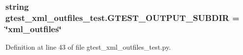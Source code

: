 \subsubsection[{\texorpdfstring{G\+T\+E\+S\+T\+\_\+\+O\+U\+T\+P\+U\+T\+\_\+\+S\+U\+B\+D\+IR}{GTEST_OUTPUT_SUBDIR}}]{\setlength{\rightskip}{0pt plus 5cm}string gtest\+\_\+xml\+\_\+outfiles\+\_\+test.\+G\+T\+E\+S\+T\+\_\+\+O\+U\+T\+P\+U\+T\+\_\+\+S\+U\+B\+D\+IR = \char`\"{}xml\+\_\+outfiles\char`\"{}}\hypertarget{namespacegtest__xml__outfiles__test_a6b3b62791305e64ec137b33bd9351b1a}{}\label{namespacegtest__xml__outfiles__test_a6b3b62791305e64ec137b33bd9351b1a}


Definition at line 43 of file gtest\+\_\+xml\+\_\+outfiles\+\_\+test.\+py.

